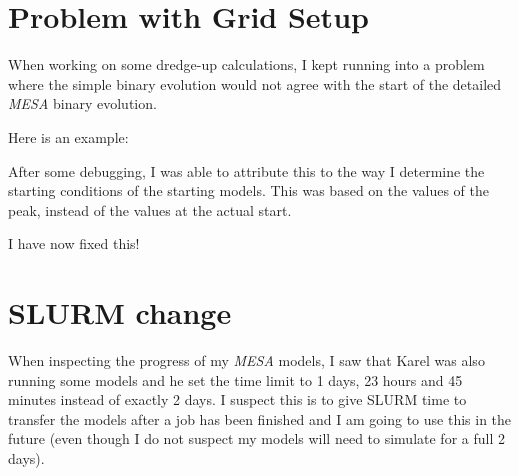 \documentclass[a4paper,10pt]{article}
\begin{document}
\begin{figure}[ht]
    \centering
\end{figure}

\begin{figure}[ht]
    \centering
\end{figure}


\section{Problem with Grid Setup}
When working on some dredge-up calculations, I kept running into a problem where the simple binary evolution would not agree with the start of the detailed \emph{MESA} binary evolution.

Here is an example:
\begin{figure}[ht]
    \centering
\end{figure}

After some debugging, I was able to attribute this to the way I determine the starting conditions of the starting models. This was based on the values of the peak, instead of the values at the actual start.

\begin{figure}[ht]
    \centering
\end{figure}

I have now fixed this!
\begin{figure}[ht]
    \centering
\end{figure}


\section{SLURM change}
When inspecting the progress of my \emph{MESA} models, I saw that Karel was also running some models and he set the time limit to 1 days, 23 hours and 45 minutes instead of exactly 2 days. I suspect this is to give SLURM time to transfer the models after a job has been finished and I am going to use this in the future (even though I do not suspect my models will need to simulate for a full 2 days). 
\end{document}
